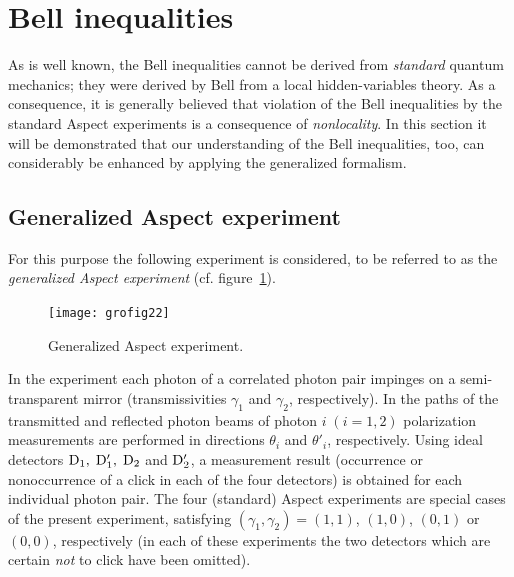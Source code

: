 \documentclass[12pt]{article}
\begin{document}
{\section{Bell inequalities}\label{sec3}
As is well known, the Bell inequalities cannot be derived from
\textit{standard} quantum mechanics; they were derived by
Bell\cite{Bell64} from a local hidden-variables theory. As a
consequence, it is generally believed that violation of the Bell
inequalities by the standard Aspect experiments\cite{Asp81,Asp82}
is a consequence of \textit{nonlocality}. In this section it will
be demonstrated that our understanding of the Bell inequalities,
too, can considerably be enhanced by applying the generalized
formalism\cite{dM2002}.

\subsection{Generalized Aspect
experiment}\label{sec3.1} For this purpose the following
experiment is considered, to be referred to as the
\textit{generalized Aspect experiment} (cf. figure~\ref{fig5}).
\begin{figure}
\centerline{\texttt{[image: grofig22]}}
 \caption{Generalized Aspect experiment.}
  \label{fig5}
\end{figure}
 In the experiment each photon of a
correlated photon pair impinges on a semi-transparent mirror
(transmissivities $\gamma_1$ and $\gamma_2$, respectively). In the
paths of the transmitted and reflected photon beams of photon
$i\;(i=1,2)$ polarization measurements are performed in directions
$\theta_i$ and $\theta'_i$, respectively. Using ideal detectors
$\rm D_1,\;D'_1,\;D_2$ and $\rm D'_2$, a measurement result
(occurrence or nonoccurrence of a click in each of the four
detectors) is obtained for each individual photon pair. The four
(standard) Aspect experiments\cite{Asp81,Asp82} are special cases
of the present experiment, satisfying $(\gamma_1,
\gamma_2)=(1,1)$, $(1,0)$, $(0,1)$ or $(0,0)$, respectively (in
each of these experiments the two detectors which are certain
\textit{not} to click have been omitted).

}
\end{document}
